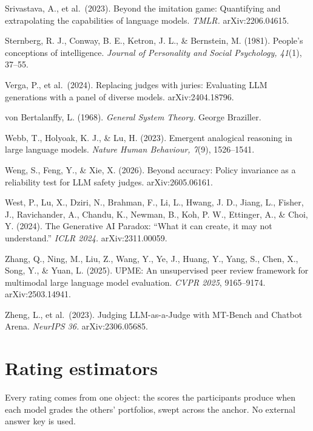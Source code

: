 \documentclass{article}
\begin{document}
Srivastava, A., et al.~(2023). Beyond the imitation game: Quantifying and extrapolating the capabilities of language models. \emph{TMLR.} arXiv:2206.04615.

Sternberg, R. J., Conway, B. E., Ketron, J. L., \& Bernstein, M. (1981). People's conceptions of intelligence. \emph{Journal of Personality and Social Psychology, 41}(1), 37--55.

Verga, P., et al.~(2024). Replacing judges with juries: Evaluating LLM generations with a panel of diverse models. arXiv:2404.18796.

von Bertalanffy, L. (1968). \emph{General System Theory.} George Braziller.

Webb, T., Holyoak, K. J., \& Lu, H. (2023). Emergent analogical reasoning in large language models. \emph{Nature Human Behaviour, 7}(9), 1526--1541.

Weng, S., Feng, Y., \& Xie, X. (2026). Beyond accuracy: Policy invariance as a reliability test for LLM safety judges. arXiv:2605.06161.

West, P., Lu, X., Dziri, N., Brahman, F., Li, L., Hwang, J. D., Jiang, L., Fisher, J., Ravichander, A., Chandu, K., Newman, B., Koh, P. W., Ettinger, A., \& Choi, Y. (2024). The Generative AI Paradox: ``What it can create, it may not understand.'' \emph{ICLR 2024.} arXiv:2311.00059.

Zhang, Q., Ning, M., Liu, Z., Wang, Y., Ye, J., Huang, Y., Yang, S., Chen, X., Song, Y., \& Yuan, L. (2025). UPME: An unsupervised peer review framework for multimodal large language model evaluation. \emph{CVPR 2025}, 9165--9174. arXiv:2503.14941.

Zheng, L., et al.~(2023). Judging LLM-as-a-Judge with MT-Bench and Chatbot Arena. \emph{NeurIPS 36.} arXiv:2306.05685.

\endgroup
\clearpage
\appendix

\section{Rating estimators}\label{rating-estimators}

Every rating comes from one object: the scores the participants produce when each model grades the others' portfolios, swept across the anchor. No external answer key is used.
\end{document}
